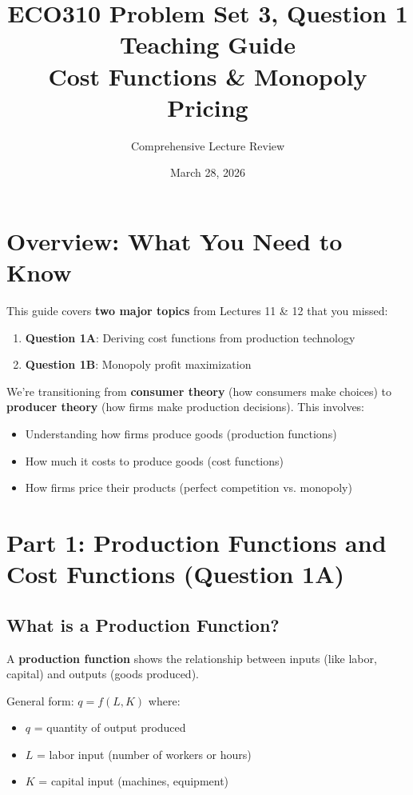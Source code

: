 \documentclass[12pt]{article}
\title{\textbf{ECO310 Problem Set 3, Question 1 Teaching Guide} \\
\large Cost Functions \& Monopoly Pricing}
\author{Comprehensive Lecture Review}
\date{March 28, 2026}
\begin{document}
\maketitle

\tableofcontents
\newpage

\section{Overview: What You Need to Know}

This guide covers \textbf{two major topics} from Lectures 11 \& 12 that you missed:

\begin{enumerate}
\item \textbf{Question 1A}: Deriving cost functions from production technology
\item \textbf{Question 1B}: Monopoly profit maximization
\end{enumerate}

\begin{keyidea}
We're transitioning from \textbf{consumer theory} (how consumers make choices) to \textbf{producer theory} (how firms make production decisions). This involves:
\begin{itemize}
\item Understanding how firms produce goods (production functions)
\item How much it costs to produce goods (cost functions)
\item How firms price their products (perfect competition vs. monopoly)
\end{itemize}
\end{keyidea}

\newpage

\section{Part 1: Production Functions and Cost Functions (Question 1A)}

\subsection{What is a Production Function?}

\begin{keyidea}
A \textbf{production function} shows the relationship between inputs (like labor, capital) and outputs (goods produced).

General form: $q = f(L, K)$ where:
\begin{itemize}
\item $q$ = quantity of output produced
\item $L$ = labor input (number of workers or hours)
\item $K$ = capital input (machines, equipment)
\end{itemize}
\end{keyidea}
\end{document}
